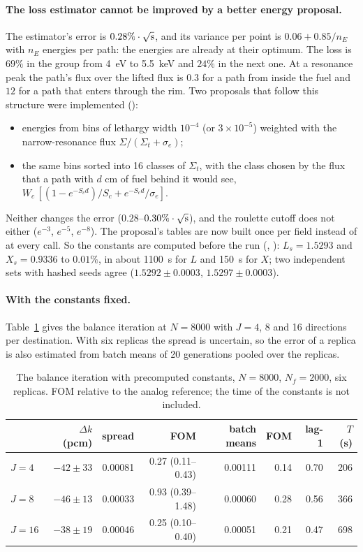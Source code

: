 \paragraph{The loss estimator cannot be improved by a better energy proposal.} The estimator's error
is $0.28\%\cdot\sqrt{\text s}$, and its variance per point is $0.06+0.85/n_E$ with $n_E$ energies
per path: the energies are already at their optimum. The loss is $69\%$ in the group from 4~eV to
5.5~keV and $24\%$ in the next one. At a resonance peak the path's flux over the lifted flux is
$0.3$ for a path from inside the fuel and $12$ for a path that enters through the rim. Two proposals
that follow this structure were implemented ():
\begin{itemize}
\item energies from bins of lethargy width $10^{-4}$ (or $3\times10^{-5}$) weighted with the
  narrow-resonance flux $\Sigma/(\Sigma_t+\sigma_e)$;
\item the same bins sorted into 16 classes of $\Sigma_t$, with the class chosen by the flux that a
  path with $d$ cm of fuel behind it would see,
  $W_c\,[(1-e^{-S_cd})/S_c+e^{-S_cd}/\sigma_e]$.
\end{itemize}
Neither changes the error ($0.28$--$0.30\%\cdot\sqrt{\text s}$), and the roulette cutoff does not
either ($e^{-3}$, $e^{-5}$, $e^{-8}$). The proposal's tables are now built once per field instead of
at every call. So the constants are computed before the run (,
): $L_s=1.5293$ and $X_s=0.9336$ to $0.01\%$, in about 1100~s for
$L$ and 150~s for $X$; two independent sets with hashed seeds agree ($1.5292\pm0.0003$,
$1.5297\pm0.0003$).

\paragraph{With the constants fixed.} Table~\ref{tab:res:constants} gives the balance iteration at
$N=8000$ with $J=4$, 8 and 16 directions per destination. With six replicas the spread is uncertain, so the
error of a replica is also estimated from batch means of 20 generations pooled over the replicas.

\begin{table}[t]\centering\small
\caption{The balance iteration with precomputed constants, $N=8000$, $N_f=2000$, six replicas.
FOM relative to the analog reference; the time of the constants is not included.}\label{tab:res:constants}
\setlength{\tabcolsep}{4pt}\footnotesize
\begin{tabular}{@{}lrrrrrrr@{}}
\toprule
 & $\Delta k$ (pcm) & spread & FOM & batch means & FOM & lag-1 & $T$ (s)\\
\midrule
$J=4$ & $-42\pm33$ & 0.00081 & 0.27 (0.11--0.43) & 0.00111 & 0.14 & 0.70 & 206\\
$J=8$ & $-46\pm13$ & 0.00033 & 0.93 (0.39--1.48) & 0.00060 & 0.28 & 0.56 & 366\\
$J=16$ & $-38\pm19$ & 0.00046 & 0.25 (0.10--0.40) & 0.00051 & 0.21 & 0.47 & 698\\
\bottomrule
\end{tabular}
\end{table}

